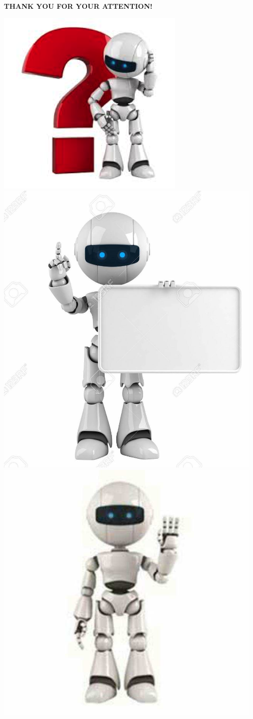 \documentclass{beamer}
\begin{document}
\begin{frame}
  \begin{center}
    
\Large{
  {\color {red} {\bf THANK YOU FOR YOUR ATTENTION!}}}

  \includegraphics[width=.3\textwidth]{robot_quest.png}
  \includegraphics[width=.3\textwidth]{robot_learned.jpg}
  \includegraphics[width=.3\textwidth]{robot.jpg}
\end{center}
\end{frame}
\end{document}
